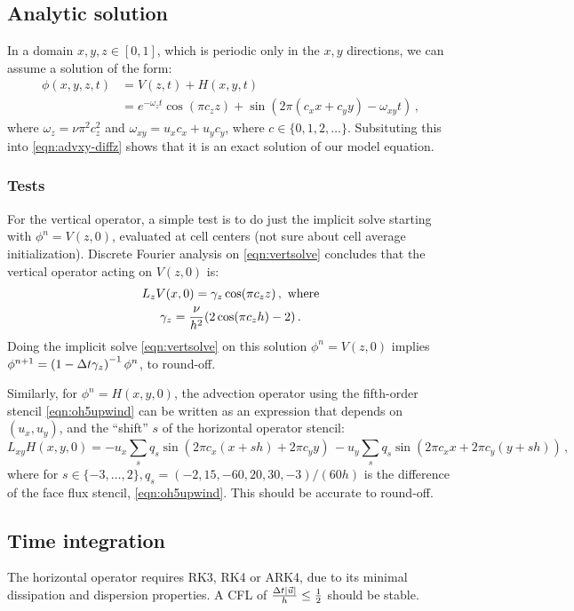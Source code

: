 \documentclass[11pt]{article}
\begin{document}
\subsection{Analytic solution}
In a domain $x,y,z \in [0,1]$, which is periodic only in the $x,y$ 
  directions, we can assume a solution of the form:
\begin{align}
\nonumber
  \phi(x,y,z,t) & = V(z,t) + H(x,y,t) \\
\label{eqn:exact}
  & = e^{-\omega_z t} \cos(\pi c_z z)
    + \sin(2\pi (c_x x + c_y y) - \omega_{xy} t) \, ,
\end{align}
  where $\omega_z = \nu \pi^2 c_z^2$ and 
  $\omega_{xy} = u_x c_x + u_y c_y$, where $c \in \{0, 1, 2, \dots\}$.
Subsituting this into \eqref{eqn:advxy-diffz} shows that it is an exact
  solution of our model equation.

\subsubsection{Tests}
For the vertical operator, a simple test is to do just the 
  implicit solve starting with $\phi^n = V(z,0)$, evaluated
  at cell centers (not sure about cell average initialization).
Discrete Fourier analysis on \eqref{eqn:vertsolve} concludes that
  the vertical operator acting on $V(z,0)$ is:
\begin{gather}
  L_{z} V(x,0) =  \gamma_z \cos(\pi c_z z)
  \, , \hbox{ where} \\
  \gamma_z = \frac{\nu}{h^2} (2 \cos(\pi c_z h) - 2) \, .
\end{gather}
Doing the implicit solve \eqref{eqn:vertsolve}
  on this solution $\phi^n = V(z,0)$
  implies $\phi^{n+1} = \left(1 - {\Delta t} \gamma_z \right)^{-1} \phi^n $,
  to round-off.

Similarly, for $\phi^n = H(x,y,0)$, the advection operator
  using the fifth-order stencil \eqref{eqn:oh5upwind} can be written as
  an expression that depends on $(u_x,u_y)$, and the ``shift'' $s$
  of the horizontal operator stencil:
\begin{equation}
  L_{xy} H(x,y,0) = 
    -u_x \sum_s q_s \sin(2\pi c_x (x + sh) + 2\pi c_y y) \, 
    -u_y \sum_s q_s \sin(2\pi c_x x + 2\pi c_y (y + sh)) 
  \, ,
\end{equation}
  where for $s \in \{-3, \dots, 2\}, q_s = (-2, 15, -60, 20, 30, -3)/(60 h)$
  is the difference of the face flux stencil, \eqref{eqn:oh5upwind}.
This should be accurate to round-off.

\subsection{Time integration}
The horizontal operator requires RK3, RK4 or ARK4, due to its minimal 
  dissipation and dispersion properties.
A CFL of $\frac{{\Delta t} |\vec{u}|}{h} \le {\frac{1}{2}}$ should be stable.
\end{document}
